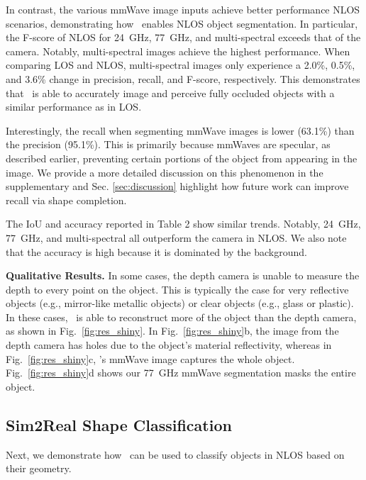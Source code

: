 In contrast, the various mmWave image inputs achieve better performance NLOS scenarios, demonstrating how \name\ enables NLOS object segmentation. In particular, the F-score of NLOS for 24~GHz, 77~GHz, and multi-spectral exceeds that of the camera. Notably, multi-spectral images achieve the highest performance. When comparing LOS and NLOS, multi-spectral images only experience a 2.0\%, 0.5\%, and 3.6\% change in precision, recall, and F-score, respectively. This demonstrates that \name\ is able to accurately image and perceive fully occluded objects with a similar performance as in LOS.

Interestingly, the recall when segmenting mmWave images is lower (63.1\%) than the precision (95.1\%). This is primarily because mmWaves are specular, as described earlier, preventing certain portions of the object from appearing in the image. We provide a more detailed discussion on this phenomenon in the supplementary and Sec. \ref{sec:discussion} highlight how future work can improve recall via shape completion.

The IoU and accuracy reported in Table 2 show similar trends. Notably, 24~GHz, 77~GHz, and multi-spectral all outperform the camera in NLOS. We also note that the accuracy is high because it is dominated by the background.


\noindent \textbf{Qualitative Results.} In some cases, the depth camera is unable to measure the depth to every point on the object. This is typically the case for very reflective objects (e.g., mirror-like metallic objects) or clear objects (e.g., glass or plastic). In these cases, \name\ is able to reconstruct more of the object than the depth camera, as shown in Fig.~\ref{fig:res_shiny}. In Fig.~\ref{fig:res_shiny}b, the image from the depth camera has holes due to the object's material reflectivity, whereas in Fig.~\ref{fig:res_shiny}c, \name's mmWave image captures the whole object. Fig.~\ref{fig:res_shiny}d shows our 77~GHz mmWave segmentation masks the entire object.




\vspace{-0.03in}
\subsection{Sim2Real Shape Classification}
\vspace{-0.03in}


Next, we demonstrate how \name\ can be used to classify objects in NLOS based on their geometry. 


